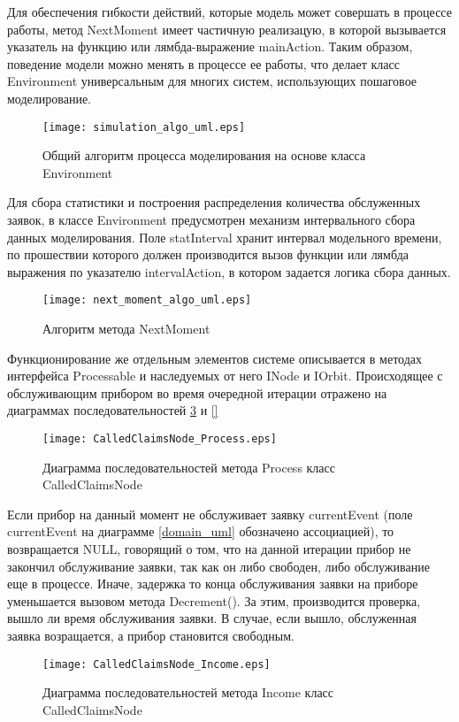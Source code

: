 Для обеспечения гибкости действий, которые модель может совершать в процессе работы, метод NextMoment имеет частичную реализацую, в которой вызывается указатель на функцию или лямбда-выражение mainAction. Таким образом, поведение модели можно менять в процессе ее работы, что делает класс Environment универсальным для многих систем, использующих пошаговое моделирование.
\begin{figure}[H]
	\centering
	\texttt{[image: simulation\_algo\_uml.eps]}
	\caption{Общий алгоритм процесса моделирования на основе класса Environment}
	\label{simulation_algo_uml}
\end{figure}

Для сбора статистики и построения распределения количества обслуженных заявок, в классе Environment предусмотрен механизм интервального сбора данных моделирования. Поле statInterval хранит интервал модельного времени, по прошествии которого должен производится вызов функции или лямбда выражения по указателю intervalAction, в котором задается логика сбора данных.
\begin{figure}[H]
	\centering
	\texttt{[image: next\_moment\_algo\_uml.eps]}
	\caption{Алгоритм метода NextMoment}
	\label{next_moment_algo_uml}
\end{figure}
Функционирование же отдельным элементов системе описывается в методах интерфейса Processable и наследуемых от него INode и IOrbit.
Происходящее с обслуживающим прибором во время очередной итерации отражено на диаграммах последовательностей \ref{CalledClaimsNode_Process_uml} и \ref{}
\begin{figure}[H]
	\centering
	\texttt{[image: CalledClaimsNode\_Process.eps]}
	\caption{Диаграмма последовательностей метода Process класс CalledClaimsNode}
	\label{CalledClaimsNode_Process_uml}
\end{figure}
Если прибор на данный момент не обслуживает заявку currentEvent (поле currentEvent на диаграмме \ref{domain_uml} обозначено ассоциацией), то возвращается NULL, говорящий о том, что на данной итерации прибор не закончил обслуживание заявки, так как он либо свободен, либо обслуживание еще в процессе. Иначе, задержка то конца обслуживания заявки на приборе уменьшается вызовом метода Decrement(). За этим, производится проверка, вышло ли время обслуживания заявки. В случае, если вышло, обслуженная заявка возращается, а прибор становится свободным.
\begin{figure}[H]
	\centering
	\texttt{[image: CalledClaimsNode\_Income.eps]}
	\caption{Диаграмма последовательностей метода Income класс CalledClaimsNode}
	\label{CalledClaimsNode_Income_uml}
\end{figure}